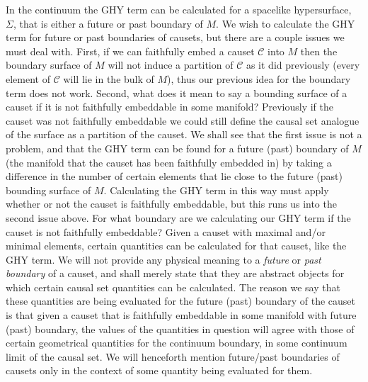 \documentclass[12pt]{article}
\begin{document}
In the continuum the GHY term can be calculated for a spacelike hypersurface, $\Sigma$, that is either a future or past boundary of $M$. We wish to calculate the GHY term for future or past boundaries of causets, but there are a couple issues we must deal with. First, if we can faithfully embed a causet $\mathcal{C}$ into $M$ then the boundary surface of $M$ will not induce a partition of $\mathcal{C}$ as it did previously (every element of $\mathcal{C}$ will lie in the bulk of $M$), thus our previous idea for the boundary term does not work. Second, what does it mean to say a bounding surface of a causet if it is not faithfully embeddable in some manifold? Previously if the causet was not faithfully embeddable we could still define the causal set analogue of the surface as a partition of the causet. We shall see that the first issue is not a problem, and that the GHY term can be found for a future (past) boundary of $M$ (the manifold that the causet has been faithfully embedded in) by taking a difference in the number of certain elements that lie close to the future (past) bounding surface of $M$. Calculating the GHY term in this way must apply whether or not the causet is faithfully embeddable, but this runs us into the second issue above. For what boundary are we calculating our GHY term if the causet is not faithfully embeddable? Given a causet with maximal and/or minimal elements, certain quantities can be calculated for that causet, like the GHY term. We will not provide any physical meaning to a \emph{future} or \emph{past boundary} of a causet, and shall merely state that they are abstract objects for which certain causal set quantities can be calculated. The reason we say that these quantities are being evaluated for the future (past) boundary of the causet is that given a causet that is faithfully embeddable in some manifold with future (past) boundary, the values of the quantities in question will agree with those of certain geometrical quantities for the continuum boundary, in some continuum limit of the causal set. We will henceforth mention future/past boundaries of causets only in the context of some quantity being evaluated for them.
\end{document}
